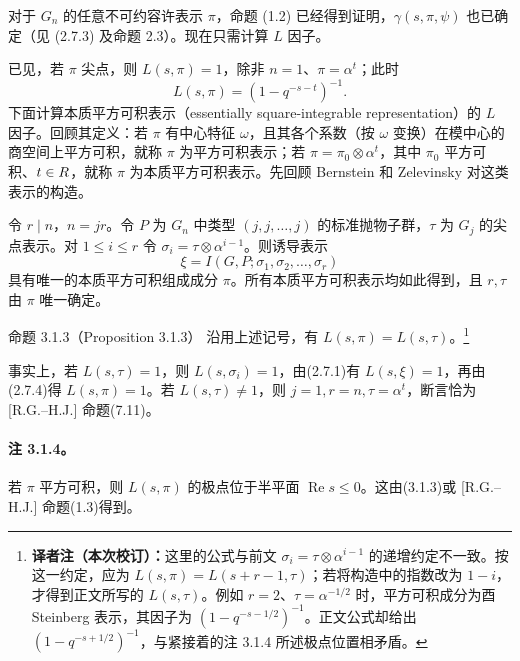 对于 $G_n$ 的任意不可约容许表示 $\pi$，命题 (1.2) 已经得到证明，$\gamma(s,\pi,\psi)$ 也已确定（见 (2.7.3) 及命题 2.3）。现在只需计算 $L$ 因子。

已见，若 $\pi$ 尖点，则 $L(s,\pi)=1$，除非 $n=1$、$\pi=\alpha^t$；此时
\begin{equation}
 L(s,\pi)=(1-q^{-s-t})^{-1}.\tag{3.1.1}
\end{equation}
下面计算本质平方可积表示（essentially square-integrable representation）的 $L$ 因子。回顾其定义：若 $\pi$ 有中心特征 $\omega$，且其各个系数（按 $\omega$ 变换）在模中心的商空间上平方可积，就称 $\pi$ 为平方可积表示；若 $\pi=\pi_0\otimes\alpha^t$，其中 $\pi_0$ 平方可积、$t\in R$，就称 $\pi$ 为本质平方可积表示。先回顾 Bernstein 和 Zelevinsky 对这类表示的构造。

令 $r\mid n$，$n=jr$。令 $P$ 为 $G_n$ 中类型 $(j,j,\ldots,j)$ 的标准抛物子群，$\tau$ 为 $G_j$ 的尖点表示。对 $1\leq i\leq r$ 令 $\sigma_i=\tau\otimes\alpha^{i-1}$。则诱导表示
\begin{equation}
 \xi=I(G,P;\sigma_1,\sigma_2,\ldots,\sigma_r)\tag{3.1.2}
\end{equation}
具有唯一的本质平方可积组成成分 $\pi$。所有本质平方可积表示均如此得到，且 $r,\tau$ 由 $\pi$ 唯一确定。

\begin{originaltheorem}{命题 3.1.3（Proposition 3.1.3）}
沿用上述记号，有 $L(s,\pi)=L(s,\tau)$。\footnote{\textbf{译者注（本次校订）：}这里的公式与前文 $\sigma_i=\tau\otimes\alpha^{i-1}$ 的递增约定不一致。按这一约定，应为 $L(s,\pi)=L(s+r-1,\tau)$；若将构造中的指数改为 $1-i$，才得到正文所写的 $L(s,\tau)$。例如 $r=2$、$\tau=\alpha^{-1/2}$ 时，平方可积成分为酉 Steinberg 表示，其因子为 $(1-q^{-s-1/2})^{-1}$。正文公式却给出 $(1-q^{-s+1/2})^{-1}$，与紧接着的注 3.1.4 所述极点位置相矛盾。}
\end{originaltheorem}
事实上，若 $L(s,\tau)=1$，则 $L(s,\sigma_i)=1$，由(2.7.1)有 $L(s,\xi)=1$，再由(2.7.4)得 $L(s,\pi)=1$。若 $L(s,\tau)\neq1$，则 $j=1,r=n,\tau=\alpha^t$，断言恰为 [R.G.--H.J.] 命题(7.11)。

\paragraph*{注 3.1.4。} 若 $\pi$ 平方可积，则 $L(s,\pi)$ 的极点位于半平面 $\operatorname{Re}s\leq0$。这由(3.1.3)或 [R.G.--H.J.] 命题(1.3)得到。

